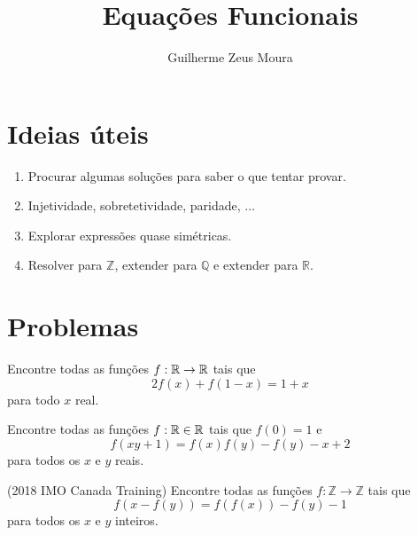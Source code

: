 \documentclass[10pt,a4paper]{article}
\title{Equações Funcionais}
\author{Guilherme Zeus Moura}
\begin{document}
	
	\zeustitle
	\section{Ideias úteis}
	\begin{enumerate}[label = ({\alph*})]
		\item Procurar algumas soluções para saber o que tentar provar.
		\item Injetividade, sobretetividade, paridade, $\dots$
		\item Explorar expressões quase simétricas.
		\item Resolver para $\mathbb{Z}$, extender para $\mathbb{Q}$ e extender para $\mathbb{R}$.
	\end{enumerate}
	\section{Problemas}
	\begin{prob}
		Encontre todas as funções $f: \mathbb{R} \to \mathbb{R}$ tais que
		$$ 2f(x) + f(1-x) = 1 + x$$
		para todo $x$ real.
	\end{prob}
	\begin{prob}
		Encontre todas as funções $f: \mathbb{R} \in \mathbb{R}$ tais que $f(0) = 1$ e
		$$ f(xy + 1) = f(x)f(y) - f(y) - x + 2$$
		para todos os $x$ e $y$ reais.
	\end{prob}
	\begin{prob}
		(2018 IMO Canada Training)
		Encontre todas as funções $f: \mathbb{Z} \to \mathbb{Z}$ tais que
		$$ f(x - f(y)) = f(f(x)) - f(y) - 1$$
		para todos os $x$ e $y$ inteiros.
	\end{prob}
\end{document}
